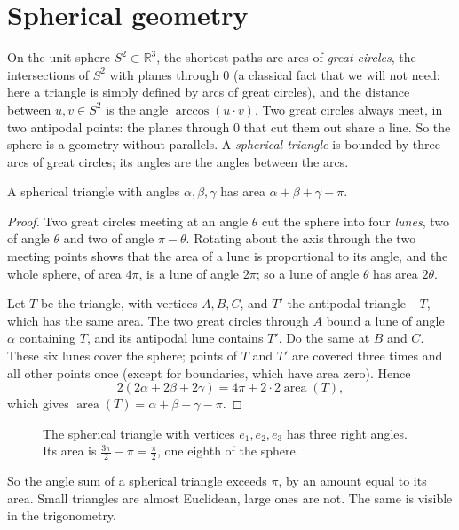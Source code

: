 \section{Spherical geometry}

On the unit sphere $S^2\subset\mathbb R^3$, the shortest paths are arcs of \emph{great circles}, the intersections of $S^2$ with planes through $0$ (a classical fact that we will
not need: here a triangle is simply defined by arcs of great circles), and the distance between $u,v\in S^2$ is the angle
$\arccos(u\cdot v)$. Two great circles always meet, in two antipodal points: the planes through $0$ that cut them out share a line. So the sphere is a
geometry without parallels. A \emph{spherical triangle} is bounded by three arcs of great circles; its angles are the angles between the arcs.

\begin{theorem}[Girard, 1629]\label{thm:girard}
A spherical triangle with angles $\alpha,\beta,\gamma$ has area $\alpha+\beta+\gamma-\pi$.
\end{theorem}

\begin{proof}
Two great circles meeting at an angle $\theta$ cut the sphere into four \emph{lunes}, two of angle $\theta$ and two of angle $\pi-\theta$. Rotating about the
axis through the two meeting points shows that the area of a lune is proportional to its angle, and the whole sphere, of area $4\pi$, is a lune of angle
$2\pi$; so a lune of angle $\theta$ has area $2\theta$.

Let $T$ be the triangle, with vertices $A,B,C$, and $T'$ the antipodal triangle $-T$, which has the same area. The two great circles through $A$ bound a lune of
angle $\alpha$ containing $T$, and its antipodal lune contains $T'$. Do the same at $B$ and $C$. These six lunes cover the sphere; points of $T$ and $T'$ are
covered three times and all other points once (except for boundaries, which have area zero). Hence
\[
2(2\alpha+2\beta+2\gamma)=4\pi+2\cdot2\operatorname{area}(T),
\]
which gives $\operatorname{area}(T)=\alpha+\beta+\gamma-\pi$.
\end{proof}

\begin{figure}[ht]
\centering
{}
\caption{The spherical triangle with vertices $e_1,e_2,e_3$ has three right angles. Its area is $\frac{3\pi}2-\pi=\frac\pi2$, one eighth of the sphere.}
\label{fig:sphere}
\end{figure}

So the angle sum of a spherical triangle exceeds $\pi$, by an amount equal to its area. Small triangles are almost Euclidean, large ones are not. The same
is visible in the trigonometry.

